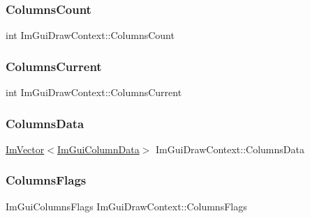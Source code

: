 \subsubsection{\texorpdfstring{Columns\+Count}{ColumnsCount}}
{\footnotesize\ttfamily int Im\+Gui\+Draw\+Context\+::\+Columns\+Count}

\hypertarget{struct_im_gui_draw_context_aeeac02b1b1dd8e02e017befff8cf9e34}{}\label{struct_im_gui_draw_context_aeeac02b1b1dd8e02e017befff8cf9e34} 
\subsubsection{\texorpdfstring{Columns\+Current}{ColumnsCurrent}}
{\footnotesize\ttfamily int Im\+Gui\+Draw\+Context\+::\+Columns\+Current}

\hypertarget{struct_im_gui_draw_context_ae0f7e8f70065e8ddc45d62cf33195a0f}{}\label{struct_im_gui_draw_context_ae0f7e8f70065e8ddc45d62cf33195a0f} 
\subsubsection{\texorpdfstring{Columns\+Data}{ColumnsData}}
{\footnotesize\ttfamily \hyperlink{class_im_vector}{Im\+Vector}$<$\hyperlink{struct_im_gui_column_data}{Im\+Gui\+Column\+Data}$>$ Im\+Gui\+Draw\+Context\+::\+Columns\+Data}

\hypertarget{struct_im_gui_draw_context_acd823cd056a5922a9f3a7c8844451ea7}{}\label{struct_im_gui_draw_context_acd823cd056a5922a9f3a7c8844451ea7} 
\subsubsection{\texorpdfstring{Columns\+Flags}{ColumnsFlags}}
{\footnotesize\ttfamily Im\+Gui\+Columns\+Flags Im\+Gui\+Draw\+Context\+::\+Columns\+Flags}

\hypertarget{struct_im_gui_draw_context_aa6b05d0a845896193dff628b02f71ba0}{}\label{struct_im_gui_draw_context_aa6b05d0a845896193dff628b02f71ba0} 
